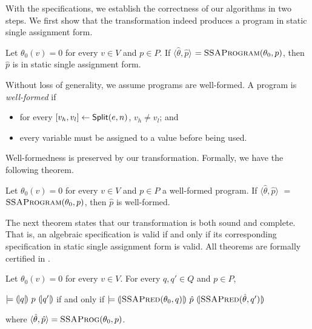 With the \coq specifications, we establish the correctness of our
algorithms in two steps. We first show that the transformation indeed
produces a program in static single assignment form.
\begin{theorem}
  Let $\theta_0(v) = 0$ for every $v \in V$ and $p \in P$.
  If $\langle \hat{\theta}, \hat{p} \rangle$ $=
  \textsc{SSAProgram}(\theta_0, p)$, then 
  $\hat{p}$ is in static single assignment form.
\end{theorem}

Without loss of generality, we assume programs are well-formed. 
A program is \emph{well-formed} if
\begin{itemize}
\item for every ${[}{v_h}, {v_l}{]} \leftarrow \mbox{\textsf{Split}}(e, n)$, $v_h
  \neq v_l$; and
\item every variable must be assigned to a value before being used.
\end{itemize}
Well-formedness is preserved by our transformation. Formally, we have
the following theorem.
\begin{theorem}
  Let $\theta_0(v) = 0$ for every $v \in V$ and $p \in P$ a
  well-formed program. If $\langle \hat{\theta}, \hat{p} \rangle$ $=$ 
  $\textsc{SSAProgram}(\theta_0, p)$, then $\hat{p}$ is well-formed.
\end{theorem}

The next theorem states that our transformation is both sound and
complete. That is, an algebraic specification is valid if and only if its
corresponding specification in static single assignment form is valid.
All theorems are formally certified in \coq. 
\begin{theorem}
  Let $\theta_0(v) = 0$ for every $v \in V$. For every $q, q' \in Q$
  and $p \in P$,
  \begin{center}
    $\models {(\!|}{q}{|\!)}~{p}~{(\!|}{q'}{|\!)}$ if and only if
    $\models {(\!|}{\textsc{SSAPred}(\theta_0, q)}{|\!)}~{\hat{p}}~{(\!|}{\textsc{SSAPred}(\hat{\theta}, q')}{|\!)}$
  \end{center}
  where $\langle \hat{\theta}, \hat{p} \rangle =
  \textsc{SSAProg}(\theta_0, p)$.
  \label{theorem:ssa}
\end{theorem}

